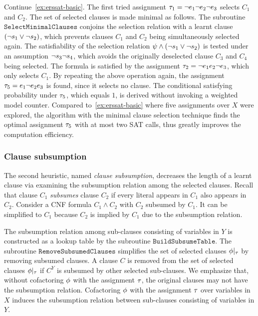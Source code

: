 \begin{example}
    \label{ex:erssat-minimal}
    Continue~\cref{ex:erssat-basic}.
    The first tried assignment $\tau_1=\lnot e_1 \lnot e_2 \lnot e_3$ selects $C_1$ and $C_2$.
    The set of selected clauses is made minimal as follows.
    The subroutine $\texttt{SelectMinimalClauses}$ conjoins the selection relation with a learnt clause $(\lnot s_{1} \lor \lnot s_{2})$,
    which prevents clauses $C_1$ and $C_2$ being simultaneously selected again.
    The satisfiability of the selection relation $\psi\land(\lnot s_{1} \lor \lnot s_{2})$ is tested under an assumption $\lnot s_{3} \lnot s_{4}$,
    which avoids the originally deselected clause $C_3$ and $C_4$ being selected.
    The formula is satisfied by the assignment $\tau_2=\lnot e_1 e_2 \lnot e_3$, which only selects $C_1$.
    By repeating the above operation again,
    the assignment $\tau_5=e_1 \lnot e_2 e_3$ is found,
    since it selects no clause.
    The conditional satisfying probability under $\tau_5$, which equals $1$,
    is derived without invoking a weighted model counter.
    Compared to~\ref{ex:erssat-basic} where five assignments over $X$ were explored,
    the algorithm with the minimal clause selection technique finds the optimal assignment $\tau_5$ with at most two SAT calls,
    thus greatly improves the computation efficiency.
\end{example}

\subsubsection{Clause subsumption}
The second heuristic, named \textit{clause subsumption},
decreases the length of a learnt clause via examining the subsumption relation among the selected clauses.
Recall that clause $C_1$ \textit{subsumes} clause $C_2$ if every literal appears in $C_1$ also appears in $C_2$.
Consider a CNF formula $C_1 \land C_2$ with $C_2$ subsumed by $C_1$.
It can be simplified to $C_1$ because $C_2$ is implied by $C_1$ due to the subsumption relation.

The subsumption relation among sub-clauses consisting of variables in $Y$ is constructed as a lookup table by the subroutine $\mathtt{BuildSubsumeTable}$.
The subroutine $\texttt{RemoveSubsumedClauses}$ simplifies the set of selected clauses $\phi|_{\tau}$ by removing subsumed clauses.
A clause $C$ is removed from the set of selected clauses $\phi|_{\tau}$ if $C^Y$ is subsumed by other selected sub-clauses.
We emphasize that, without cofactoring $\phi$ with the assignment $\tau$,
the original clauses may not have the subsumption relation.
Cofactoring $\phi$ with the assignment $\tau$ over variables in $X$ induces the subsumption relation between sub-clauses consisting of variables in $Y$.

